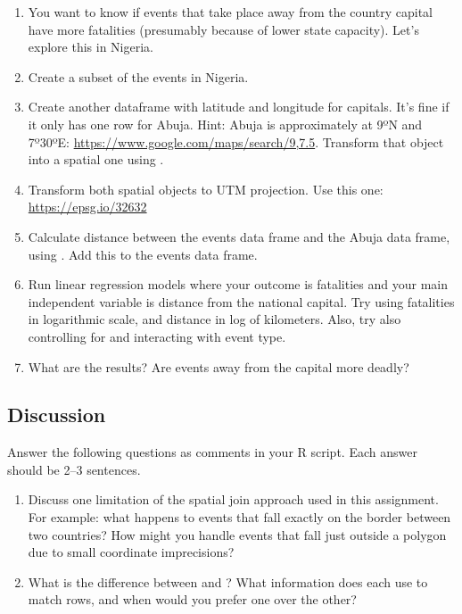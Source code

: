 \begin{enumerate}[label=\alph*)]
  \item You want to know if events that take place away from the country capital have more fatalities (presumably because of lower state capacity). Let's explore this in Nigeria.
  \item Create a subset of the events in Nigeria.
  \item Create another dataframe with latitude and longitude for capitals. It's fine if it only has one row for Abuja. Hint: Abuja is approximately at 9ºN and 7º30ºE: \url{https://www.google.com/maps/search/9,7.5}. Transform that object into a spatial one using .
  \item Transform both spatial objects to UTM projection. Use this one: \url{https://epsg.io/32632}
  \item Calculate distance between the events data frame and the Abuja data frame, using . Add this to the events data frame.
  \item Run linear regression models where your outcome is fatalities and your main independent variable is distance from the national capital. Try using fatalities in logarithmic scale, and distance in log of kilometers. Also, try also controlling for and interacting with event type.
  \item What are the results? Are events away from the capital more deadly?
\end{enumerate}

\subsection{Discussion}

Answer the following questions as comments in your R script. Each answer should be 2--3 sentences.

\begin{enumerate}[label=\alph*)]
  \item Discuss one limitation of the spatial join approach used in this assignment. For example: what happens to events that fall exactly on the border between two countries? How might you handle events that fall just outside a polygon due to small coordinate imprecisions?

  \item What is the difference between  and ? What information does each use to match rows, and when would you prefer one over the other?
\end{enumerate}

